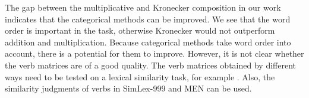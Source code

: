 The gap between the multiplicative and Kronecker composition in our work indicates that the categorical methods can be improved. We see that the word order is important in the task, otherwise Kronecker would not outperform addition and multiplication. Because categorical methods take word order into account, there is a potential for them to improve. However, it is not clear whether the verb matrices are of a good quality. The verb matrices obtained by different ways need to be tested on a lexical similarity task, for example . Also, the similarity judgments of verbs in SimLex-999 and MEN can be used.



